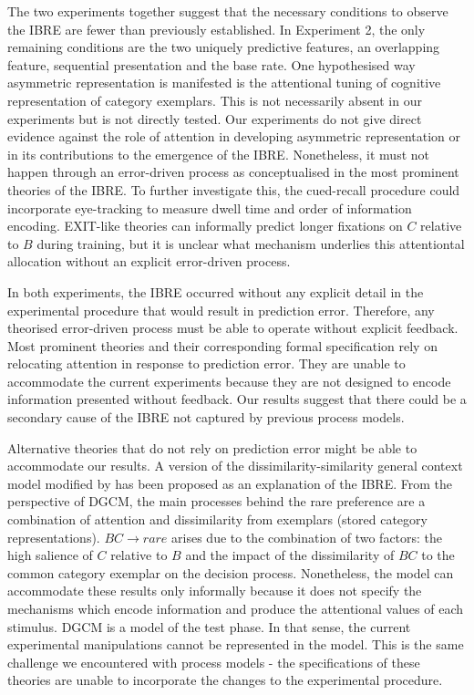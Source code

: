 \documentclass[10pt,letterpaper]{article}
\begin{document}
The two experiments together suggest that the necessary conditions to observe the IBRE are fewer than previously established.
In Experiment 2, the only remaining conditions are the two uniquely predictive features, an overlapping feature, sequential presentation and the base rate.
One hypothesised way asymmetric representation is manifested is the attentional tuning of cognitive representation of category exemplars.
This is not necessarily absent in our experiments but is not directly tested.
Our experiments do not give direct evidence against the role of attention in developing asymmetric representation or in its contributions to the emergence of the IBRE.
Nonetheless, it must not happen through an error-driven process as conceptualised in the most prominent theories of the IBRE.
To further investigate this, the cued-recall procedure could incorporate eye-tracking to measure dwell time and order of information encoding.
EXIT-like theories can informally predict longer fixations on $C$ relative to $B$ during training, but it is unclear what mechanism underlies this attentiontal allocation without an explicit error-driven process.

In both experiments, the IBRE occurred without any explicit detail in the experimental procedure that would result in prediction error.
Therefore, any theorised error-driven process must be able to operate without explicit feedback.
Most prominent theories and their corresponding formal specification rely on relocating attention in response to prediction error.
They are unable to accommodate the current experiments because they are not designed to encode information presented without feedback.
Our results suggest that there could be a secondary cause of the IBRE not captured by previous process models.

Alternative theories that do not rely on prediction error might be able to accommodate our results.
A version of the dissimilarity-similarity general context model \cite<DGCM, >{stewart2007dissimilarity} modified by \cite{o2018model} has been proposed as an explanation of the IBRE.
From the perspective of DGCM, the main processes behind the rare preference are a combination of attention and dissimilarity from exemplars (stored category representations).
$BC \to rare$ arises due to the combination of two factors: the high salience of $C$ relative to $B$ and the impact of the dissimilarity of $BC$ to the common category exemplar on the decision process.
Nonetheless, the model can accommodate these results only informally because it does not specify the mechanisms which encode information and produce the attentional values of each stimulus.
DGCM is a model of the test phase.
In that sense, the current experimental manipulations cannot be represented in the model.
This is the same challenge we encountered with process models - the specifications of these theories are unable to incorporate the changes to the experimental procedure.
\end{document}
